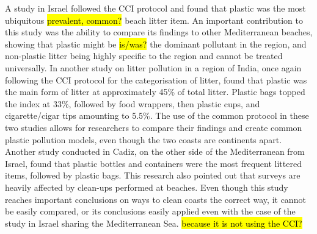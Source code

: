 \documentclass[10pt]{article}\usepackage[]{graphicx}\usepackage[]{color}
\begin{document}
A study in Israel followed the CCI protocol and found that plastic was the most ubiquitous \hl{prevalent, common?} beach litter item. An important contribution to this study was the ability to compare its findings to other Mediterranean beaches, showing that plastic might be \hl{is/was?} the dominant pollutant in the region, and non-plastic litter being highly specific to the region and cannot be treated universally. \cite{PORTMAN2017} In another study on litter pollution in a region of India, once again following the CCI protocol for the categorisation of litter, found that plastic was the main form of litter at approximately 45\% of total litter. Plastic bags topped the index at 33\%, followed by food wrappers, then plastic cups, and cigarette/cigar tips amounting to 5.5\%. \cite{KUMAR2016} The use of the common protocol in these two studies allows for researchers to compare their findings and create common plastic pollution models, even though the two coasts are continents apart. \\

Another study conducted in Cadiz, on the other side of the Mediterranean from Israel, found that plastic bottles and containers were the most frequent littered items, followed by plastic bags. This research also pointed out that surveys are heavily affected by clean-ups performed at beaches. \cite{WILLIAMS2016} Even though this study reaches important conclusions on ways to clean coasts the correct way, it cannot be easily compared, or its conclusions easily applied even with the case of the study in Israel sharing the Mediterranean Sea. \hl{because it is not using the CCI?}  \\
\end{document}
